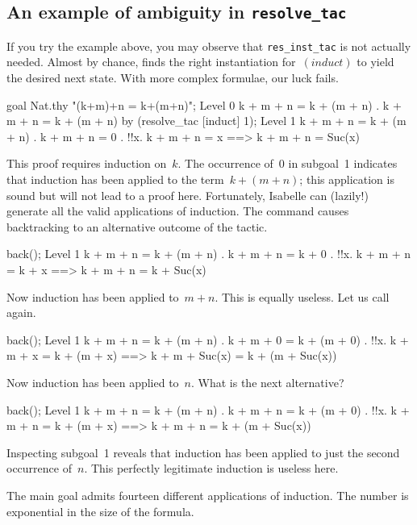 \subsection{An example of ambiguity in {\tt resolve_tac}}
If you try the example above, you may observe that {\tt res_inst_tac} is
not actually needed.  Almost by chance,  finds the right
instantiation for~$(induct)$ to yield the desired next state.  With more
complex formulae, our luck fails.  
\begin{ttbox}
goal Nat.thy "(k+m)+n = k+(m+n)";
{\out Level 0}
{\out k + m + n = k + (m + n)}
{. k + m + n = k + (m + n)}
\ttbreak
by (resolve_tac [induct] 1);
{\out Level 1}
{\out k + m + n = k + (m + n)}
{. k + m + n = 0}
{. !!x. k + m + n = x ==> k + m + n = Suc(x)}
\end{ttbox}
This proof requires induction on~$k$.  The occurrence of~0 in subgoal~1
indicates that induction has been applied to the term~$k+(m+n)$; this
application is sound but will not lead to a proof here.  Fortunately,
Isabelle can (lazily!) generate all the valid applications of induction.
The  command causes backtracking to an alternative outcome of
the tactic.
\begin{ttbox}
back();
{\out Level 1}
{\out k + m + n = k + (m + n)}
{. k + m + n = k + 0}
{. !!x. k + m + n = k + x ==> k + m + n = k + Suc(x)}
\end{ttbox}
Now induction has been applied to~$m+n$.  This is equally useless.  Let us
call  again.
\begin{ttbox}
back();
{\out Level 1}
{\out k + m + n = k + (m + n)}
{. k + m + 0 = k + (m + 0)}
{. !!x. k + m + x = k + (m + x) ==>}
{\out          k + m + Suc(x) = k + (m + Suc(x))}
\end{ttbox}
Now induction has been applied to~$n$.  What is the next alternative?
\begin{ttbox}
back();
{\out Level 1}
{\out k + m + n = k + (m + n)}
{. k + m + n = k + (m + 0)}
{. !!x. k + m + n = k + (m + x) ==> k + m + n = k + (m + Suc(x))}
\end{ttbox}
Inspecting subgoal~1 reveals that induction has been applied to just the
second occurrence of~$n$.  This perfectly legitimate induction is useless
here.  

The main goal admits fourteen different applications of induction.  The
number is exponential in the size of the formula.

